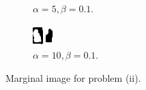\documentclass{article}
\begin{document}
\begin{figure}[t]
\begin{subfigure}[t]{0.25\textwidth}
  \vspace{-0.6cm}
  \caption{$\alpha=5, \beta=0.1$.}
  \label{f:ii-2}
\end{subfigure}
\begin{subfigure}[t]{0.25\textwidth}
  \centering
  \includegraphics[width=\textwidth]{ii_alpha_10_beta_0.1.bmp}
  \vspace{-0.6cm}
  \caption{$\alpha=10, \beta=0.1$.}
  \label{f:ii-3}
\end{subfigure}
\vspace{-0.3cm}
\caption{Marginal image for problem (ii).}
\label{f:denoise_ii}
\end{figure}
\\
\end{document}
